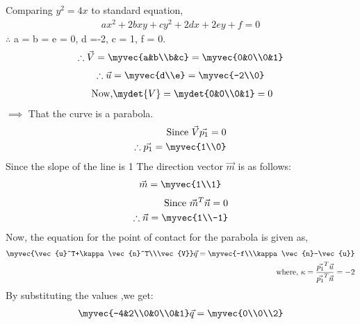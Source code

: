 Comparing $y^2=4x$ to standard equation,
\begin{align}
ax^2+2bxy+cy^2+2dx+2ey+f = 0
\end{align}
$\therefore$ a = b = e = 0, d =-2, c = 1, f = 0.
\begin{align}
\therefore \vec{V} = \myvec{a&b\\b&c} = \myvec{0&0\\0&1}
\end{align} 
\begin{align}
\therefore\vec{u} = \myvec{d\\e} = \myvec{-2\\0}\label{eq:solutions/1/20/u}
\end{align}
\begin{align}
 \mbox{ Now,} \mydet{V} = \mydet{0&0\\0&1} = 0
\end{align}
$\implies$ That the curve is a parabola.
\begin{align}
    \mbox{Since} \ \vec{V}\vec{p_1}=0\\
    \therefore \vec{p_1}=\myvec{1\\0}
\end{align}
Since the slope of the line is 1
The direction vector $\vec{m}$ is as follows:
\begin{align}
\vec{m} = \myvec{1\\1}
\end{align}
\begin{align}
    \mbox{Since} \ \vec{m}^T\vec{n}=0 \\
    \therefore \vec{n} = \myvec{1\\-1}\label{eq:solutions/1/20/n}
\end{align} 
Now, the equation for the point of contact for the parabola is given as,
\begin{align}
\myvec{\vec{u}^T+\kappa\vec{n}^T\\\vec{V}}\vec{q} = \myvec{-f\\\kappa\vec{n}-\vec{u}}\label{eq:solutions/1/20/contact}\\
\mbox{where, } \kappa = \frac{\vec{p_1}^T\vec{u}}{\vec{p_1}^T\vec{n}} = -2 \label{eq:solutions/1/20/k}
\end{align}
By substituting the values ,we get:
\begin{align}
\myvec{-4&2\\0&0\\0&1}\vec{q} = \myvec{0\\0\\2}
\label{eq:solutions/1/20/solve_q}
\end{align}
